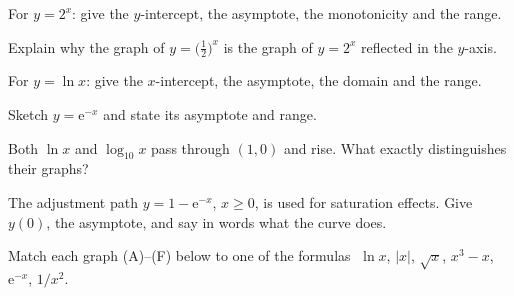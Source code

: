 \begin{problems}[resume]
  \item For $y=2^{x}$: give the $y$-intercept, the asymptote, the
        monotonicity and the range.
  \item Explain why the graph of $y=\bigl(\tfrac12\bigr)^{x}$ is the graph
        of $y=2^{x}$ reflected in the $y$-axis.
  \item For $y=\ln x$: give the $x$-intercept, the asymptote, the domain
        and the range.
  \item Sketch $y=\mathrm{e}^{-x}$ and state its asymptote and range.
  \item Both $\ln x$ and $\log_{10}x$ pass through $(1,0)$ and rise. What
        exactly distinguishes their graphs?
  \item The adjustment path $y=1-\mathrm{e}^{-x}$, $x\ge0$, is used for
        saturation effects. Give $y(0)$, the asymptote, and say in words
        what the curve does.
\end{problems}

\begin{problems}[resume]
  \item Match each graph (A)--(F) below to one of the formulas
        $\;\ln x$, \;$|x|$, \;$\sqrt{x}$, \;$x^{3}-x$,
        \;$\mathrm{e}^{-x}$, \;$1/x^{2}$.
\end{problems}

\begin{gallery}
\hfill
{}\hfill
{}
\end{gallery}

